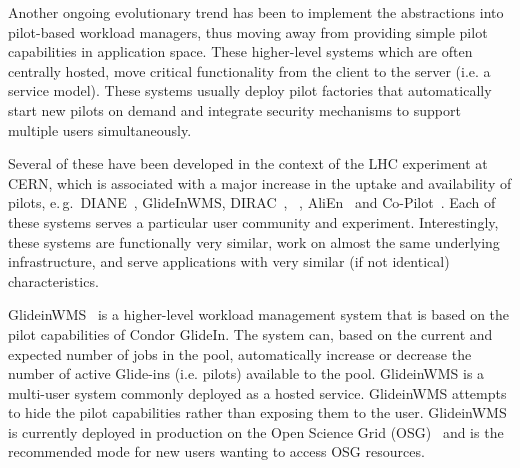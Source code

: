 \documentclass{sig-alternate}
\begin{document}
Another ongoing evolutionary trend has been to implement the \pilot abstractions
into pilot-based workload managers, thus moving away from providing simple
pilot capabilities in application space. These higher-level systems which are
often centrally hosted, move critical functionality from the client to the
server (i.e. a service model). These systems usually deploy pilot factories
that automatically start new pilots on demand and integrate security mechanisms
to support multiple users simultaneously.

Several of these have been developed in the context of the LHC experiment at
CERN, which is associated with a major increase in the uptake and availability
of pilots, e.\,g.\ DIANE~\cite{Moscicki:908910}, GlideInWMS,
DIRAC~\cite{1742-6596-219-6-062049}, \panda~\cite{1742-6596-331-7-072069},
AliEn~\cite{1742-6596-119-6-062012} and Co-Pilot~\cite{copilot-tr}. Each of
these \pilotjob systems serves a particular user community and experiment.
Interestingly, these systems are functionally very similar, work on almost the
same underlying infrastructure, and serve applications with very similar (if not
identical) characteristics.


  


GlideinWMS~\cite{1742-6596-119-6-062044} is a higher-level workload management
system that is based on the pilot capabilities of Condor GlideIn. The system
can, based on the current and expected number of jobs in the pool, automatically
increase or decrease the number of active Glide-ins (i.e. pilots) available to
the pool. GlideinWMS is a multi-user \pilotjob system commonly deployed as a
hosted service. GlideinWMS attempts to hide the pilot capabilities rather than
exposing them to the user. GlideinWMS is currently deployed in production on the
Open Science Grid (OSG)~\cite{url_osg} and is the recommended mode for new users
wanting to access OSG resources.
\end{document}
